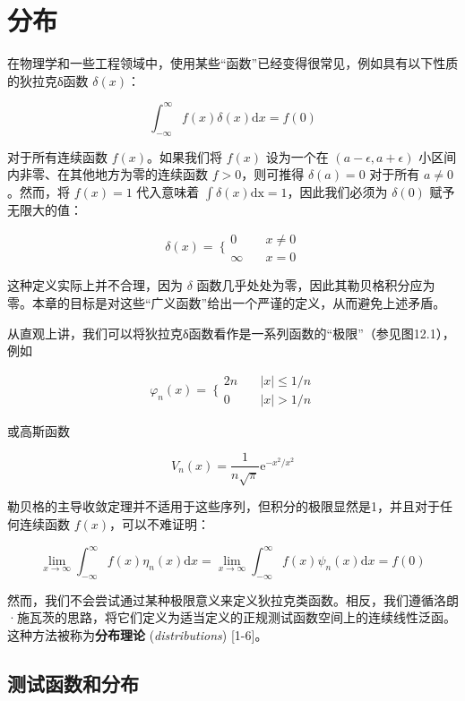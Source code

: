 \section{分布}\label{ux5206ux5e03}

在物理学和一些工程领域中，使用某些``函数''已经变得很常见，例如具有以下性质的狄拉克δ函数
\(\delta(x)\)：

\[\int_{- \infty}^{\infty}f(x)\delta(x)\mathrm{d}x = f(0)\]

对于所有连续函数 \(f(x)\)。如果我们将 \(f(x)\) 设为一个在
\((a - \epsilon,a + \epsilon)\) 小区间内非零、在其他地方为零的连续函数
\(f > 0\)，则可推得 \(\delta(a) = 0\) 对于所有 \(a \neq 0\)。然而，将
\(f(x) = 1\) 代入意味着 \(\int\delta(x)\mathrm{dx} = 1\)，因此我们必须为
\(\delta(0)\) 赋予无限大的值：

\[\delta(x) = \left. \ \{\begin{array}{ll}
0 & \quad x \neq 0 \\
\infty & \quad x = 0
\end{array} \right.\]

这种定义实际上并不合理，因为 \(\delta\)
函数几乎处处为零，因此其勒贝格积分应为零。本章的目标是对这些``广义函数''给出一个严谨的定义，从而避免上述矛盾。

从直观上讲，我们可以将狄拉克δ函数看作是一系列函数的``极限''（参见图12.1），例如

\[\varphi_{n}(x) = \left. \ \{\begin{array}{ll}
2n & \quad|x| \leq 1/n \\
0 & \quad|x| > 1/n
\end{array} \right.\]

或高斯函数

\[V_{n}(x) = \frac{1}{n\sqrt{\pi}}\mathrm{e}^{- x^{2}/x^{2}}\]

勒贝格的主导收敛定理并不适用于这些序列，但积分的极限显然是1，并且对于任何连续函数
\(f(x)\)，可以不难证明：

\[\lim\limits_{x \rightarrow \infty}\int_{- \infty}^{\infty}f(x)\eta_{n}(x)\mathrm{d}x = \lim\limits_{x \rightarrow \infty}\int_{- \infty}^{\infty}f(x)\psi_{n}(x)\mathrm{d}x = f(0)\]

然而，我们不会尝试通过某种极限意义来定义狄拉克类函数。相反，我们遵循洛朗·施瓦茨的思路，将它们定义为适当定义的正规测试函数空间上的连续线性泛函。这种方法被称为\textbf{分布理论}
(\emph{distributions}) {[}1-6{]}。

\subsection{测试函数和分布}\label{ux6d4bux8bd5ux51fdux6570ux548cux5206ux5e03}

